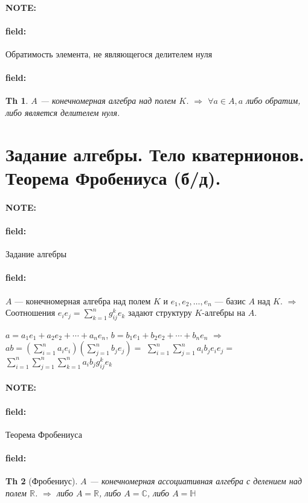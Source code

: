 \documentclass[12pt]{article}
\newenvironment{note}{\paragraph{NOTE:}}{}
\newenvironment{field}{\paragraph{field:}}{}
\newtheorem{theorem}{Th}
\begin{document}
\begin{note}
  \begin{field}
    Обратимость элемента, не являющегося делителем нуля
  \end{field}
  \begin{field}
    \begin{theorem}
      $A$ --- конечномерная алгебра над полем $K$.
      $\Rightarrow$
      $\forall a \in A, a$ либо обратим, либо является делителем нуля.
    \end{theorem}
  \end{field}
\end{note}

\section{Задание алгебры. Тело кватернионов. Теорема Фробениуса (б/д).}

\begin{note}
  \begin{field}
    Задание алгебры
  \end{field}
  \begin{field}
    $A$ --- конечномерная алгебра над полем $K$
    и $e_{1}, e_{2}, \ldots, e_{n}$ --- базис $A$ над $K$.
    $\Rightarrow$
    Соотношения $e_{i}e_{j} = \sum_{k=1}^{n} g_{ij}^{k} e_{k}$
    задают структуру $K$-алгебры на $A$.

    $a = a_{1}e_{1} + a_{2}e_{2} + \cdots + a_{n}e_{n}$,
    $b = b_{1}e_{1} + b_{2}e_{2} + \cdots + b_{n}e_{n}$
    $\Rightarrow$
    $ab = \left(\sum_{i=1}^{n} a_{i}e_{i}\right) \left(\sum_{j=1}^{n} b_{j}e_{j}\right) =$
    $\sum_{i=1}^{n}\sum_{j=1}^{n}a_{i}b_{j}e_{i}e_{j} =$
    $\sum_{i=1}^{n}\sum_{j=1}^{n}\sum_{k=1}^{n}a_{i}b_{j}g_{ij}^{k}e_{k}$
  \end{field}
\end{note}


\begin{note}
  \begin{field}
    Теорема Фробениуса
  \end{field}
  \begin{field}
    \begin{theorem}[Фробениус]
      $A$ --- конечномерная ассоциативная алгебра с делением над полем $\mathbb{R}$.
      $\Rightarrow$
      либо $A = \mathbb{R}$,
      либо $A = \mathbb{C}$,
      либо $A = \mathbb{H}$
    \end{theorem}
  \end{field}
\end{note}
\end{document}
